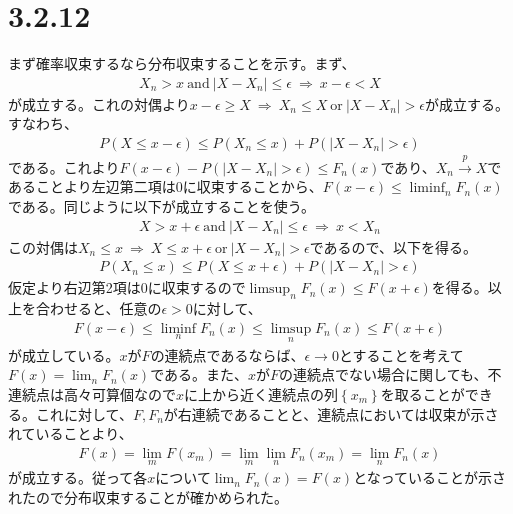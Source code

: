 \documentclass{article}
\begin{document}
\section{3.2.12}
まず確率収束するなら分布収束することを示す。まず、
\begin{align*}
	X_n > x\ \text{and}\ |X - X_n| \leq \epsilon\ \Rightarrow\ x-\epsilon < X
\end{align*}
が成立する。これの対偶より$x - \epsilon \geq X\ \Rightarrow\ X_n \leq X\ \text{or}\ |X- X_n| > \epsilon$が成立する。すなわち、
\begin{align*}
	P\left( X \leq x-\epsilon \right) \leq P\left( X_n \leq x \right) + P\left(  |X- X_n| > \epsilon \right)
\end{align*}
である。これより$F(x-\epsilon) - P\left(  |X- X_n| > \epsilon \right) \leq F_n(x)$であり、$X_n \xrightarrow{p}X$であることより左辺第二項は$0$に収束することから、$F(x-\epsilon) \leq \liminf_{n} F_n(x)$である。同じように以下が成立することを使う。
\begin{align*}
	X > x+ \epsilon\ \text{and}\ |X-X_n| \leq \epsilon\ \Rightarrow\ x < X_n
\end{align*}
この対偶は$X_n\leq x\ \Rightarrow\ X\leq x + \epsilon\ \text{or}\ |X-X_n| > \epsilon$であるので、以下を得る。
\begin{align*}
	P\left(X_n\leq x \right) \leq P\left( X\leq x + \epsilon \right) + P\left( |X-X_n| > \epsilon \right)
\end{align*}
仮定より右辺第2項は$0$に収束するので$\limsup_n F_n(x) \leq F(x+\epsilon)$を得る。以上を合わせると、任意の$\epsilon > 0$に対して、
\begin{align*}
	F(x-\epsilon) \leq \liminf_{n} F_n(x) \leq \limsup_n F_n(x) \leq F(x+\epsilon)
\end{align*}
が成立している。$x$が$F$の連続点であるならば、$\epsilon \to 0$とすることを考えて$F(x) = \lim_n F_n(x)$である。また、$x$が$F$の連続点でない場合に関しても、不連続点は高々可算個なので$x$に上から近く連続点の列$\left\{ x_m \right\}$を取ることができる。これに対して、$F, F_n$が右連続であることと、連続点においては収束が示されていることより、
\begin{align*}
	F(x) = \lim_m F(x_m) = \lim_m \lim_n F_n(x_m) = \lim_n F_n(x)
\end{align*}
が成立する。従って各$x$について$\lim_n F_n(x) = F(x)$となっていることが示されたので分布収束することが確かめられた。
\end{document}
